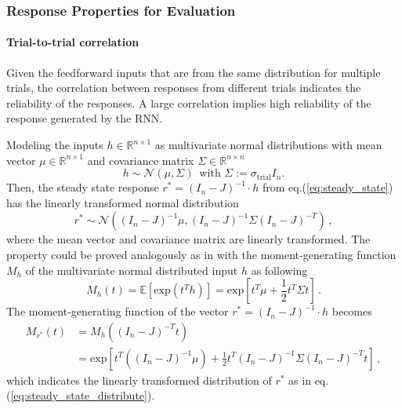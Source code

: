\documentclass[11pt]{article}
\begin{document}
{	\subsubsection{Response Properties for Evaluation} \label{sec:response_properties_for_evaluation}
	\paragraph{Trial-to-trial correlation} \label{para:ttc_sym}
	Given the feedforward inputs that are from the same distribution for multiple trials, the correlation between responses from different trials indicates the reliability of the responses. A large correlation implies high reliability of the response generated by the RNN. 
	
	Modeling the inputs $h \in \mathbb{R} ^{n \times 1}$ as multivariate normal distributions with mean vector $\mu \in \mathbb{R}^{n \times 1}$ and covariance matrix $\Sigma \in \mathbb{R}^{n \times n}$
		\begin{equation} \label{eq:input_distribution}
			h \sim \mathcal{N} (\mu, \Sigma) \, \text{ with } \Sigma := \sigma_{\text{trial}}I_n. 
		\end{equation}
	Then, the steady state response $r^* = (I_n - J)^{-1} \cdot h $ from eq.(\ref{eq:steady_state}) has the linearly transformed normal distribution
		\begin{equation} \label{eq:steady_state_distribute}
			r^* \sim \mathcal{N} \left((I_n - J)^{-1}\mu, (I_n - J)^{-1} \Sigma (I_n -J)^{-T}\right) \, ,
		\end{equation}
	where the mean vector and covariance matrix are linearly transformed. The property could be proved analogously as in \cite{Soch2019} with the moment-generating function $M_h$ of the multivariate normal distributed input $h$ as following
		\begin{equation}
			M_h(t) = \mathbb{E}\left[\text{exp}(t^Th)\right] = \text{exp} \left[t^T \mu + \frac{1}{2} t^T \Sigma t \right] \, .
		\end{equation}
	The moment-generating function of the vector $r^* = (I_n - J)^{-1} \cdot h$ becomes
		\begin{equation}
			\begin{split}
				M_{r^*}(t) & = M_h \left( (I_n-J)^{-T} t\right) \\
				        & = \text{exp} \left[
				         						t^T \left( (I_n - J)^{-1} \mu\right) + \frac{1}{2} t^T (I_n - J)^{-1} \Sigma (I_n - J)^{-T} t    
				         				\right] \, ,
			\end{split} 
		\end{equation}
	which indicates the linearly transformed distribution of $r^*$ as in eq.(\ref{eq:steady_state_distribute}).
	
}
\end{document}
